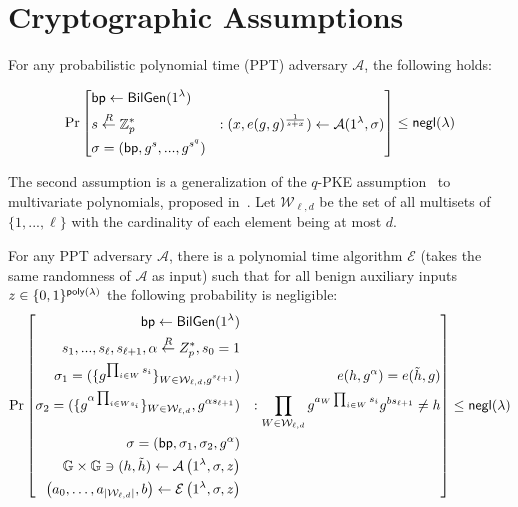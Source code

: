 \newpage

\appendix

\section{Cryptographic Assumptions}\label{app:assume}{}
\begin{assumption}
	\label{asp::qSDH}
	For any probabilistic polynomial time (PPT) adversary $\mathcal{A}$, the following holds:
	
	\[\Pr\left[ \begin{aligned}
	&\mathsf{bp} \leftarrow \mathsf{BilGen}(1^\lambda) & \\
	&s \overset{R}{\leftarrow} \mathbb{Z}^{*}_{p} & : (x, e(g, g)^{\frac{1}{s+x}}) \leftarrow \mathcal{A}(1^\lambda, \sigma)\\
	&\sigma = (\mathsf{bp}, g^s, ..., g^{s^q})
	\end{aligned} \right] \le {\sf negl}{(\lambda)}\]
\end{assumption}

The second assumption is a generalization of the $q$-PKE assumption~\cite{groth2010short} to multivariate polynomials, proposed in~\cite{zhang2017vsql,zkvpd}. Let $\mathcal {W}_ {\ell,d}$ be the set of all multisets of $\{1, . . . , \ell\}$ with the cardinality of each element being at most $d$. 

\begin{assumption}
	\label{asp::dlEPKE}
	For any PPT adversary $\mathcal{A}$, there is a polynomial time algorithm $\mathcal{E}$ (takes the same randomness of $\mathcal{A}$ as input) such that for all benign auxiliary inputs $z \in \{0,1\}^{{\sf poly}({\lambda})}$ the following probability is negligible:
	\[\Pr\left[ \begin{aligned}
	\mathsf{bp} \leftarrow \mathsf{BilGen}(1^\lambda) && \\
	s_1, ..., s_\ell, s_{\ell + 1}, \alpha \overset{R}{\leftarrow} Z_{p}^*, s_0=1 && \\
	\sigma_1 = (\{g^{\prod_{i\in W}s_i}\}_{W\in \mathcal{W}_{\ell, d}, g^{s_{\ell+1}}}) &&\hspace*{10pt} e(h, g^\alpha)=e(\tilde{h}, g)\\
	\sigma_2 = (\{g^{\alpha\prod_{i\in Ws_i}}\}_{W\in \mathcal{W}_{\ell, d}}, g^{\alpha s_{\ell+1}}) && : \prod_{W\in \mathcal{W}_{\ell, d}}g^{a_{W}\prod_{i\in W}s_i}g^{b{s_{\ell+1}}}\neq h\\
	\sigma = (\mathsf{bp}, \sigma_1, \sigma_2, g^{\alpha}) && \\
	\mathbb{G} \times \mathbb{G} \ni (h, \tilde{h}) \leftarrow \mathcal{A} \left(1^{\lambda}, \sigma, z\right)&& \\
	\left( a _ { 0 } , \dots , a _ { \left| \mathcal { W } _ { \ell , d } \right| } , b \right) \leftarrow \mathcal { E } \left( 1 ^ { \lambda } , \sigma , z \right) &&
	\end{aligned}\right] \le {\sf negl}{(\lambda)}\]
\end{assumption}

